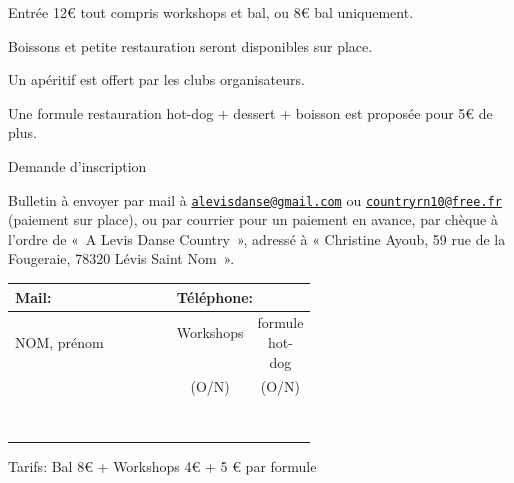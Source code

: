 \documentclass[12pt,a4paper]{article}
\begin{document}
\vfill
\hrulefill
\vfill

Entrée 12\euro{} tout compris workshops et bal, ou 8\euro{} bal uniquement.

Boissons et petite restauration seront disponibles sur place.

Un apéritif est offert par les clubs organisateurs.

Une formule restauration hot-dog + dessert + boisson est proposée pour 5\euro{} de plus.

\vfill
\hrulefill
\hrulefill
\vfill

\begin{center}
\Large Demande d'inscription
\end{center}

Bulletin à envoyer par mail à
\href{mailto:alevisdanse@gmail.com?subject=Inscription Bal 13
  Decembre}{\texttt{\color{blue!50!black}alevisdanse@gmail.com}} ou
\href{mailto:countryrn10@free.fr}{\texttt{\color{blue!50!black}countryrn10@free.fr}}
(paiement sur place), ou par courrier pour un paiement en avance, par
chèque à l'ordre de «~A Levis Danse Country~», adressé à « Christine Ayoub, 59 rue de
la Fougeraie, 78320 Lévis Saint Nom~».
\begin{center}
  \begin{tabular}{|p{0.6\linewidth}|c|c|}
    \hline
    \multicolumn{1}{|l|}{Mail:} & \multicolumn{2}{l|}{Téléphone:} \\
\hline\hline
  NOM, prénom  & \quad Workshops \quad ~ & formule hot-dog \\
               & (O/N) & (O/N) \\
  \hline
  & & \\
  & & \\
  \hline
  & & \\
  & & \\
  \hline
  & & \\
  & & \\
  \hline
  & & \\
  & & \\
  \hline
\end{tabular}
\end{center}
Tarifs: Bal 8\euro{} + Workshops 4\euro{} + 5 \euro{} par formule
\end{document}
